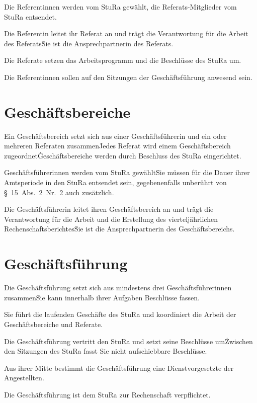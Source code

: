 \begin{multicols}{2}
\Abs \Satz Die Referentinnen werden vom StuRa gewählt, die Referats-Mitglieder vom StuRa entsendet.

\Abs \Satz Die Referentin leitet ihr Referat an und trägt die Verantwortung für die Arbeit des Referats\. Sie ist die Ansprechpartnerin des Referats.

\Abs \Satz Die Referate setzen das Arbeitsprogramm und die Beschlüsse des StuRa um.

\Abs \Satz Die Referentinnen sollen auf den Sitzungen der Geschäftsführung anwesend sein.



\section{Geschäftsbereiche}

\Abs \Satz Ein Geschäftsbereich setzt sich aus einer Geschäftsführerin und ein oder mehreren Referaten zusammen\. Jedes Referat wird einem Geschäftsbereich zugeordnet\. Geschäftsbereiche werden durch Beschluss des StuRa eingerichtet.

\Abs \Satz Geschäftsführerinnen werden vom StuRa gewählt\. Sie müssen für die Dauer ihrer Amtsperiode in den StuRa entsendet sein, gegebenenfalls unberührt von §~15~Abs.~2~Nr.~2 auch zusätzlich.

\Abs \Satz Die Geschäftsführerin leitet ihren Geschäftsbereich an und trägt die Verantwortung für die Arbeit und die Erstellung des vierteljährlichen Rechenschaftsberichtes\. Sie ist die Ansprechpartnerin des Geschäftsbereichs.



\section{Geschäftsführung}

\Abs \Satz Die Geschäftsführung setzt sich aus mindestens drei Geschäftsführerinnen zusammen\. Sie kann innerhalb ihrer Aufgaben Beschlüsse fassen.

\Abs \Satz Sie führt die laufenden Geschäfte des StuRa und koordiniert die Arbeit der Geschäftsbereiche und Referate.

\Abs \Satz Die Geschäftsführung vertritt den StuRa und setzt seine Beschlüsse um\. Zwischen den Sitzungen des StuRa fasst Sie nicht aufschiebbare Beschlüsse.

\Abs \Satz Aus ihrer Mitte bestimmt die Geschäftsführung eine Dienstvorgesetzte der Angestellten.

\Abs \Satz Die Geschäftsführung ist dem StuRa zur Rechenschaft verpflichtet.




\end{multicols}
